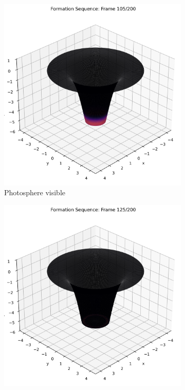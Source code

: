 \documentclass[12pt]{article}
\begin{document}
\begin{figure}[H]
  \begin{subfigure}[b]{0.3\textwidth}
    \includegraphics[width=\textwidth]{frame_105.png}
    \caption{Photosphere visible}
  \end{subfigure}
  \hfill
  \begin{subfigure}[b]{0.3\textwidth}
    \includegraphics[width=\textwidth]{frame_125.png}

\end{subfigure}
\end{figure}
\end{document}
